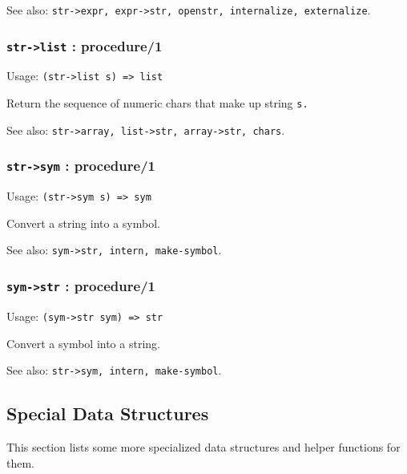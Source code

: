 \documentclass[
]{article}
\newcommand{\passthrough}[1]{#1}
\begin{document}
See also:
\passthrough{\lstinline!str->expr, expr->str, openstr, internalize, externalize!}.

\hypertarget{str-list-procedure1}{%
\subsubsection{\texorpdfstring{\texttt{str-\textgreater{}list} :
procedure/1}{str-\textgreater list : procedure/1}}\label{str-list-procedure1}}

Usage: \passthrough{\lstinline!(str->list s) => list!}

Return the sequence of numeric chars that make up string
\passthrough{\lstinline!s.!}

See also:
\passthrough{\lstinline!str->array, list->str, array->str, chars!}.

\hypertarget{str-sym-procedure1}{%
\subsubsection{\texorpdfstring{\texttt{str-\textgreater{}sym} :
procedure/1}{str-\textgreater sym : procedure/1}}\label{str-sym-procedure1}}

Usage: \passthrough{\lstinline!(str->sym s) => sym!}

Convert a string into a symbol.

See also: \passthrough{\lstinline!sym->str, intern, make-symbol!}.

\hypertarget{sym-str-procedure1}{%
\subsubsection{\texorpdfstring{\texttt{sym-\textgreater{}str} :
procedure/1}{sym-\textgreater str : procedure/1}}\label{sym-str-procedure1}}

Usage: \passthrough{\lstinline!(sym->str sym) => str!}

Convert a symbol into a string.

See also: \passthrough{\lstinline!str->sym, intern, make-symbol!}.

\hypertarget{special-data-structures}{%
\subsection{Special Data Structures}\label{special-data-structures}}

This section lists some more specialized data structures and helper
functions for them.
\end{document}
